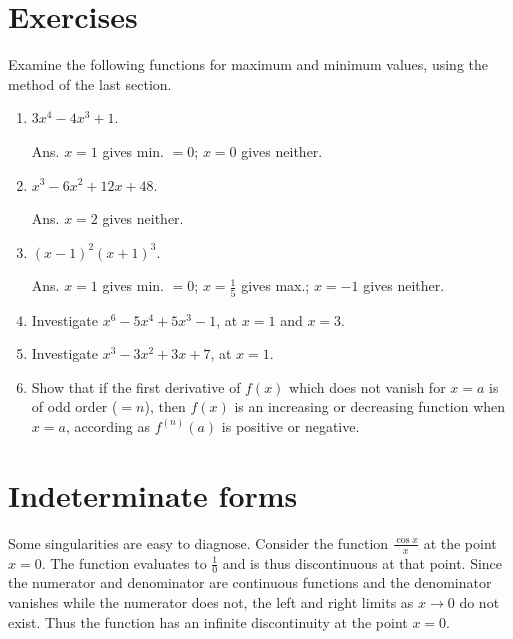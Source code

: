 \section{Exercises}

Examine the following functions for maximum and minimum values, 
using the method of the last section.

\begin{enumerate}
\item
$3x^4-4x^3 + 1$.

Ans. 	$x = 1$ gives min. $= 0$; $x = 0$ gives neither.

\item
$x^3-6x^2 + 12x + 48$.

Ans.  	$x = 2$ gives neither.

\item
$(x-1)^2(x + 1)^3$.

Ans. $x = 1$ gives min. $= 0$;
$x = \frac{1}{5}$ gives max.;
$x = -1$ gives neither.

\item
Investigate $x^6-5x^4 + 5x^3-1$, at $x = 1$ and $x = 3$.

\item
Investigate $x^3-3x^2 + 3x + 7$, at $x = 1$.

\item
Show that if the first derivative of $f(x)$ which does not 
vanish for $x = a$ is of odd order ($= n$), then $f(x)$ is an increasing or 
decreasing function when $x = a$, according as $f^{(n)}(a)$ is positive or negative.
\end{enumerate}

\section{Indeterminate forms}
\label{sec:109}

Some singularities are easy to diagnose.  Consider the function 
$\frac{\cos x}{x}$ at the point $x = 0$.  The function evaluates to 
$\frac{1}{0}$ and is thus discontinuous at that point.  Since the numerator
and denominator are continuous functions and the denominator vanishes while
the numerator does not, the left and right limits as $x \to 0$ do not 
exist.  Thus the function has an infinite discontinuity at the point
$x = 0$.  

